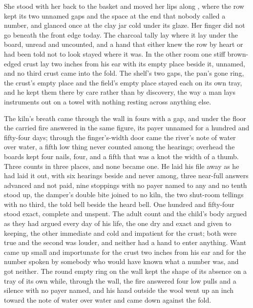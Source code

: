 She stood with her back to the basket and moved her lips along , where the row kept its two unnamed gaps and the space at the end that nobody called a number, and glanced once at the clay jar cold under its glaze. Her finger did not go beneath the front edge today. The charcoal tally lay where it lay under the board, unread and uncounted, and a hand that either knew the row by heart or had been told not to look stayed where it was. In the other room one stiff brown-edged crust lay two inches from his ear with its empty place beside it, unnamed, and no third crust came into the fold. The shelf's two gaps, the pan's gone ring, the crust's empty place and the field's empty place stayed each on its own tray, and he kept them there by care rather than by discovery, the way a man lays instruments out on a towel with nothing resting across anything else.

The kiln's breath came through the wall in fours with a gap, and under the floor the carried fire answered in the same figure, its payer unnamed for a hundred and fifty-four days; through the finger's-width door came the river's note of water over water, a fifth low thing never counted among the hearings; overhead the boards kept four nails, four, and a fifth that was a knot the width of a thumb. Three counts in three places, and none became one. He laid his file away as he had laid it out, with six hearings beside and never among, three near-full answers advanced and not paid, nine stoppings with no payer named to any and no tenth stood up, the damper's double bite joined to no kiln, the two shut-room tellings with no third, the told bell beside the heard bell. One hundred and fifty-four stood exact, complete and unspent. The adult count and the child's body argued as they had argued every day of his life, the one dry and exact and given to keeping, the other immediate and cold and impatient for the crust; both were true and the second was louder, and neither had a hand to enter anything. Want came up small and importunate for the crust two inches from his ear and for the number spoken by somebody who would have known what a number was, and got neither. The round empty ring on the wall kept the shape of its absence on a tray of its own while, through the wall, the fire answered four low pulls and a silence with no payer named, and his hand outside the wool went up an inch toward the note of water over water and came down against the fold.
